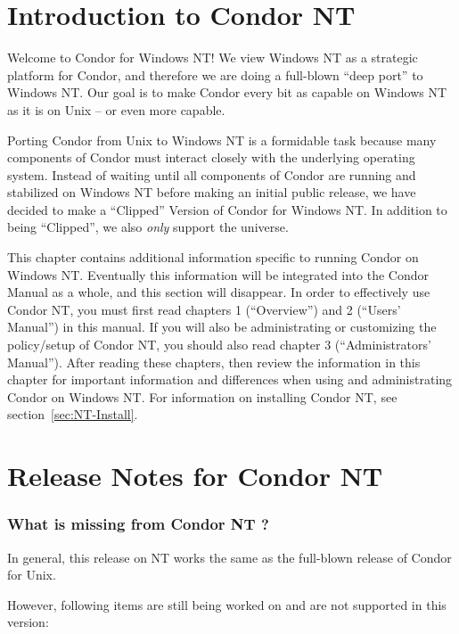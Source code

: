 \section{Introduction to Condor NT \VersionNotice}
Welcome to Condor for Windows NT!  
We view Windows NT as a strategic platform for Condor, and therefore we are
doing a full-blown ``deep port'' to Windows NT.
Our goal is to make Condor every bit as capable on Windows NT as it is on
Unix -- or even more capable.  

Porting Condor from Unix to Windows NT is a formidable task because many
components of Condor must interact closely with the underlying operating
system.  Instead of waiting until all components of Condor are running
and stabilized on Windows NT before making an initial public release,
we have decided to make a ``Clipped'' Version of Condor for Windows
NT. In addition to being ``Clipped'', we also \emph{only} support the
 universe.

This chapter contains additional information specific to running
Condor on Windows NT.  Eventually this information will be integrated
into the Condor Manual as a whole, and this section will disappear.
In order to effectively use Condor NT, you must first read chapters 1
(``Overview'') and 2 (``Users' Manual'') in this manual.  If you will
also be administrating or customizing the policy/setup of Condor NT,
you should also read chapter 3 (``Administrators' Manual'').  After
reading these chapters, then review the information in this chapter for
important information and differences when using and administrating
Condor on Windows NT.  For information on installing Condor NT, see
section~\ref{sec:NT-Install}.  


\section{Release Notes for Condor NT \VersionNotice}

\subsubsection{What is missing from Condor NT \VersionNotice?}

In general, this release on NT works the same as the full-blown
release of Condor for Unix.  

However, following items are still being worked on and are not supported
in this version:

